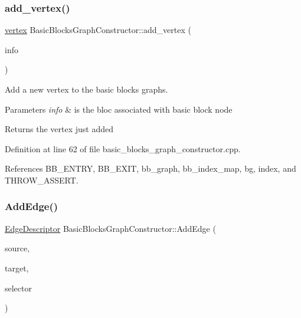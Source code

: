 \subsubsection{\texorpdfstring{add\+\_\+vertex()}{add\_vertex()}}
{\footnotesize\ttfamily \hyperlink{graph_8hpp_abefdcf0544e601805af44eca032cca14}{vertex} Basic\+Blocks\+Graph\+Constructor\+::add\+\_\+vertex (\begin{DoxyParamCaption}\item[{const bloc\+Ref}]{info }\end{DoxyParamCaption})}



Add a new vertex to the basic blocks graphs. 


\begin{DoxyParams}{Parameters}
{\em info} & is the bloc associated with basic block node \\
\hline
\end{DoxyParams}
\begin{DoxyReturn}{Returns}
the vertex just added 
\end{DoxyReturn}


Definition at line 62 of file basic\+\_\+blocks\+\_\+graph\+\_\+constructor.\+cpp.



References B\+B\+\_\+\+E\+N\+T\+RY, B\+B\+\_\+\+E\+X\+IT, bb\+\_\+graph, bb\+\_\+index\+\_\+map, bg, index, and T\+H\+R\+O\+W\+\_\+\+A\+S\+S\+E\+RT.

\mbox{\label{classBasicBlocksGraphConstructor_a40ce400031161e9fb4e09869bcaff221}} 
\subsubsection{\texorpdfstring{Add\+Edge()}{AddEdge()}}
{\footnotesize\ttfamily \hyperlink{graph_8hpp_a9eb9afea34e09f484b21f2efd263dd48}{Edge\+Descriptor} Basic\+Blocks\+Graph\+Constructor\+::\+Add\+Edge (\begin{DoxyParamCaption}\item[{const \hyperlink{graph_8hpp_abefdcf0544e601805af44eca032cca14}{vertex}}]{source,  }\item[{const \hyperlink{graph_8hpp_abefdcf0544e601805af44eca032cca14}{vertex}}]{target,  }\item[{const int}]{selector }\end{DoxyParamCaption})}



